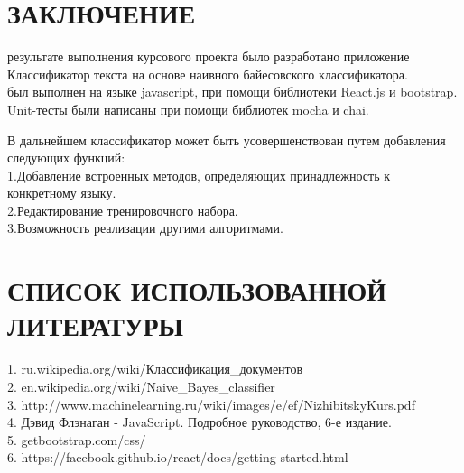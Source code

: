 \documentclass[14pt,a4paper]{extreport}
\begin{document}
	\section*{\center\normalsize ЗАКЛЮЧЕНИЕ \endcenter}
	 результате выполнения курсового проекта было разработано приложение Классификатор текста на основе наивного байесовского классификатора.
    \\  был выполнен на языке javascript, при помощи библиотеки React.js и bootstrap. Unit-тесты были написаны при помощи библиотек mocha и chai.
    \\ \par В дальнейшем классификатор может быть усовершенствован путем добавления следующих функций:
    \\ \hspace{3ex} 1.Добавление встроенных методов, определяющих принадлежность к конкретному языку.
    \\ \hspace{3ex} 2.Редактирование тренировочного набора.
    \\ \hspace{3ex} 3.Возможность реализации другими алгоритмами.
    \newpage
	\section*{\center\normalsize СПИСОК ИСПОЛЬЗОВАННОЙ ЛИТЕРАТУРЫ \endcenter}

    1. ru.wikipedia.org/wiki/Классификация\_документов
    \\2. en.wikipedia.org/wiki/Naive\_Bayes\_classifier
    \\3. http://www.machinelearning.ru/wiki/images/e/ef/NizhibitskyKurs.pdf
    \\4. Дэвид Флэнаган - JavaScript. Подробное руководство, 6-е издание.
    \\5. getbootstrap.com/css/
    \\6. https://facebook.github.io/react/docs/getting-started.html
	
	\newpage
\end{document}

